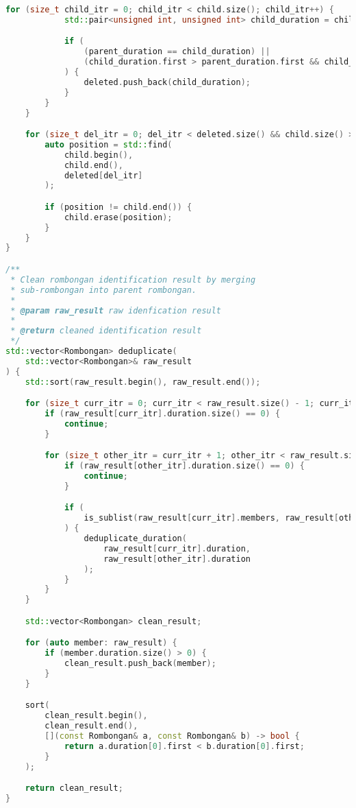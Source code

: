 \begin{lstlisting}[language=C++, caption=Implementasi fungsi \texttt{identify\_rombongan}, label={lamp:identify-rombongan}]
        for (size_t child_itr = 0; child_itr < child.size(); child_itr++) {
            std::pair<unsigned int, unsigned int> child_duration = child[child_itr];

            if (
                (parent_duration == child_duration) ||
                (child_duration.first > parent_duration.first && child_duration.second < parent_duration.second)
            ) {
                deleted.push_back(child_duration);
            }
        }
    }

    for (size_t del_itr = 0; del_itr < deleted.size() && child.size() > 0; del_itr++) {
        auto position = std::find(
            child.begin(),
            child.end(),
            deleted[del_itr]
        );

        if (position != child.end()) {
            child.erase(position);
        }
    }
}

/**
 * Clean rombongan identification result by merging
 * sub-rombongan into parent rombongan.
 * 
 * @param raw_result raw idenfication result
 *
 * @return cleaned identification result
 */
std::vector<Rombongan> deduplicate(
    std::vector<Rombongan>& raw_result
) {
    std::sort(raw_result.begin(), raw_result.end());

    for (size_t curr_itr = 0; curr_itr < raw_result.size() - 1; curr_itr++) {
        if (raw_result[curr_itr].duration.size() == 0) {
            continue;
        }

        for (size_t other_itr = curr_itr + 1; other_itr < raw_result.size(); other_itr++) {
            if (raw_result[other_itr].duration.size() == 0) {
                continue;
            }

            if (
                is_sublist(raw_result[curr_itr].members, raw_result[other_itr].members)
            ) {
                deduplicate_duration(
                    raw_result[curr_itr].duration,
                    raw_result[other_itr].duration
                );
            }
        }
    }

    std::vector<Rombongan> clean_result;

    for (auto member: raw_result) {
        if (member.duration.size() > 0) {
            clean_result.push_back(member);
        }
    }

    sort(
        clean_result.begin(),
        clean_result.end(),
        [](const Rombongan& a, const Rombongan& b) -> bool {
            return a.duration[0].first < b.duration[0].first;
        }
    );

    return clean_result;
}



\end{lstlisting}
